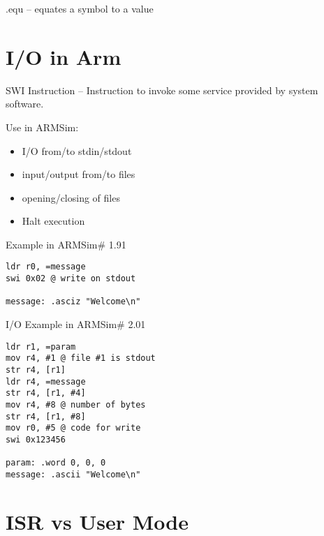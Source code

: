 \documentclass{scrartcl}
\begin{document}
.equ -- equates a symbol to a value

\section{I/O in Arm}
SWI Instruction -- Instruction to invoke some service provided by system software.

Use in ARMSim:
\begin{itemize}
	\item I/O from/to stdin/stdout
	\item input/output from/to files
	\item opening/closing of files
	\item Halt execution
\end{itemize}

Example in ARMSim\# 1.91
\begin{lstlisting}
ldr r0, =message
swi 0x02 @ write on stdout

message: .asciz "Welcome\n"
\end{lstlisting}

I/O Example in ARMSim\# 2.01
\begin{lstlisting}
ldr r1, =param
mov r4, #1 @ file #1 is stdout
str r4, [r1]
ldr r4, =message
str r4, [r1, #4]
mov r4, #8 @ number of bytes
str r4, [r1, #8]
mov r0, #5 @ code for write
swi 0x123456

param: .word 0, 0, 0
message: .ascii "Welcome\n"
\end{lstlisting}

\section{ISR vs User Mode}
\end{document}
